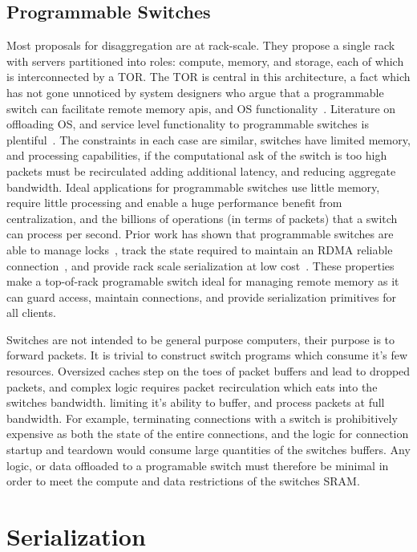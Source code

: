 \subsection{Programmable Switches} Most proposals for
disaggregation are at rack-scale. They propose a single rack
with servers partitioned into roles: compute, memory, and
storage, each of which is interconnected by a TOR.  The TOR
is central in this architecture, a fact which has not gone
unnoticed by system designers who argue that a programmable
switch can facilitate remote memory apis, and OS
functionality~\cite{disandapp,mind}. 
Literature on offloading OS, and service level functionality
to programmable switches is
plentiful~\cite{netlock,netkv,netchain,netcache}. The
constraints in each case are similar, switches have limited
memory, and processing capabilities, if the computational
ask of the switch is too high packets must be recirculated
adding additional latency, and reducing aggregate bandwidth.
Ideal applications for programmable switches use little
memory, require little processing and enable a huge
performance benefit from centralization, and the billions of
operations (in terms of packets) that a switch can process
per second.
Prior work has shown that programmable switches are able to
manage locks~\cite{netlock}, track the state required to
maintain an RDMA reliable connection~\cite{tea}, and provide
rack scale serialization at low
cost~\cite{eris,no,when-computer}. These properties make a
top-of-rack programable switch ideal for managing remote
memory as it can guard access, maintain connections, and
provide serialization primitives for all clients.


Switches are not intended to be general purpose computers,
their purpose is to forward packets. It is trivial to
construct switch programs which consume it's few resources.
Oversized caches step on the toes of packet buffers and lead
to dropped packets, and complex logic requires packet
recirculation which eats into the switches bandwidth.
limiting it's ability to buffer, and process packets at full
bandwidth.
For example, terminating connections with a switch is
prohibitively expensive as both the state of the entire
connections, and the logic for connection startup and
teardown would consume large quantities of the switches
buffers. Any logic, or data offloaded to a programable
switch must therefore be minimal in order to meet the
compute and data restrictions of the switches SRAM.


\section{Serialization}

